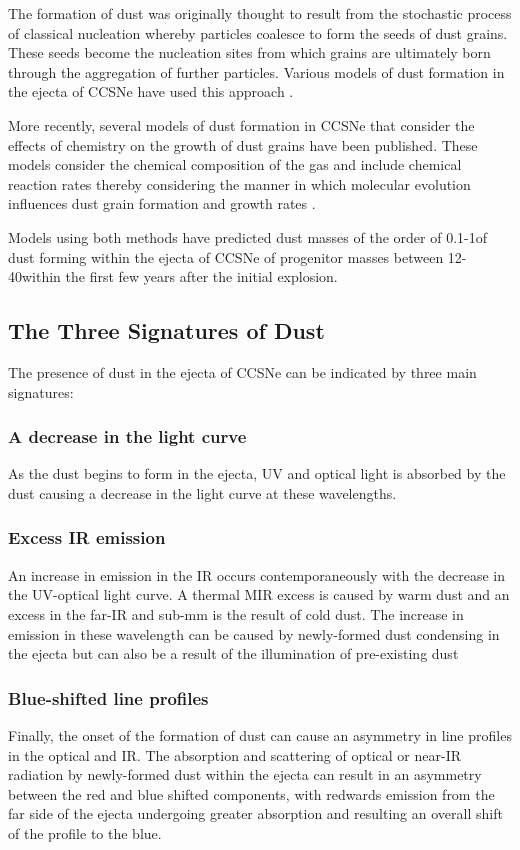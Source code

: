 The formation of dust was originally thought to result from the stochastic process of classical nucleation whereby particles coalesce to form the seeds of dust grains.  These seeds become the nucleation sites from which grains are ultimately born through the aggregation of further particles.  Various models of dust formation in the ejecta of CCSNe have used this approach \citep{Kozasa1989, Todini2001,Nozawa2003, Schneider2004}.  

More recently, several models of dust formation in CCSNe that consider the effects of chemistry on the growth of dust grains have been published.   These models consider the chemical composition of the gas and include chemical reaction rates thereby considering the manner in which molecular evolution influences dust grain formation and growth rates \citep{Cherchneff2009, Cherchneff2010, Sarangi2013, Sarangi2015}.

Models using both methods have predicted dust masses of the order of 0.1-1\msun of dust forming within the ejecta of CCSNe of progenitor masses between 12-40\msun within the first few years after the initial explosion.

\subsection{The Three Signatures of Dust}

The presence of dust in the ejecta of CCSNe can be indicated by three main signatures: 

\subsubsection{A decrease in the light curve} 
As the dust begins to form in the ejecta, UV and optical light is absorbed by the dust causing a decrease in the light curve at these wavelengths.

\subsubsection{Excess IR emission}
An increase in emission in the IR occurs contemporaneously with the decrease in the UV-optical light curve.  A thermal MIR excess is caused by warm dust and an excess in the far-IR and sub-mm is the result of cold dust.  The increase in emission in these wavelength can be caused by newly-formed dust condensing in the ejecta but can also be a result of the illumination of pre-existing dust

\subsubsection{Blue-shifted line profiles}
Finally, the onset of the formation of dust can cause an asymmetry in line profiles in the optical and IR.  The absorption and scattering of optical or near-IR radiation by newly-formed dust within the ejecta can result in an asymmetry between the red and blue shifted components, with redwards 
emission from the far side of the ejecta undergoing greater absorption and resulting an overall shift of the profile to the blue.
\\

